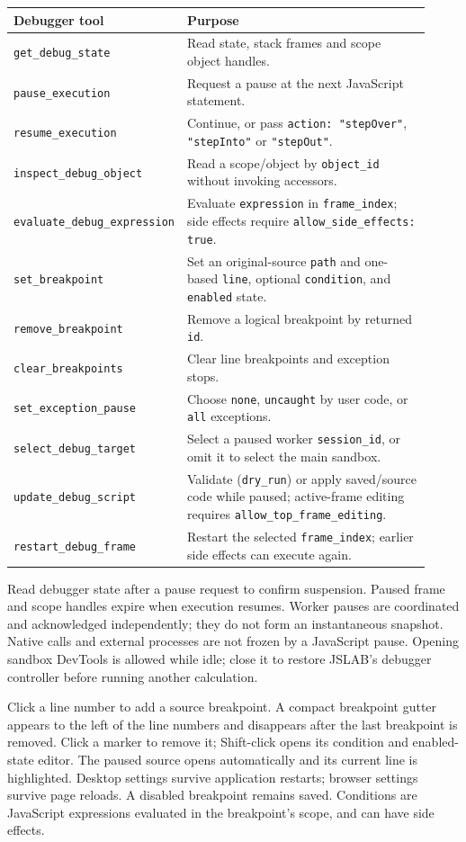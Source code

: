 \documentclass[12pt,a4paper]{article}
\begin{document}
\begin{longtable}{p{0.30\linewidth}p{0.62\linewidth}}
\hline
Debugger tool & Purpose \\
\hline
\texttt{get\_debug\_state} & Read state, stack frames and scope object handles. \\
\texttt{pause\_execution} & Request a pause at the next JavaScript statement. \\
\texttt{resume\_execution} & Continue, or pass \texttt{action: "stepOver"}, \texttt{"stepInto"} or \texttt{"stepOut"}. \\
\texttt{inspect\_debug\_object} & Read a scope/object by \texttt{object\_id} without invoking accessors. \\
\texttt{evaluate\_debug\_expression} & Evaluate \texttt{expression} in \texttt{frame\_index}; side effects require \texttt{allow\_side\_effects: true}. \\
\texttt{set\_breakpoint} & Set an original-source \texttt{path} and one-based \texttt{line}, optional \texttt{condition}, and \texttt{enabled} state. \\
\texttt{remove\_breakpoint} & Remove a logical breakpoint by returned \texttt{id}. \\
\texttt{clear\_breakpoints} & Clear line breakpoints and exception stops. \\
\texttt{set\_exception\_pause} & Choose \texttt{none}, \texttt{uncaught} by user code, or \texttt{all} exceptions. \\
\texttt{select\_debug\_target} & Select a paused worker \texttt{session\_id}, or omit it to select the main sandbox. \\
\texttt{update\_debug\_script} & Validate (\texttt{dry\_run}) or apply saved/source code while paused; active-frame editing requires \texttt{allow\_top\_frame\_editing}. \\
\texttt{restart\_debug\_frame} & Restart the selected \texttt{frame\_index}; earlier side effects can execute again. \\
\hline
\end{longtable}
Read debugger state after a pause request to confirm suspension. Paused frame and scope handles expire when execution resumes. Worker pauses are coordinated and acknowledged independently; they do not form an instantaneous snapshot. Native calls and external processes are not frozen by a JavaScript pause. Opening sandbox DevTools is allowed while idle; close it to restore JSLAB's debugger controller before running another calculation.

Click a line number to add a source breakpoint. A compact breakpoint gutter appears to the left of the line numbers and disappears after the last breakpoint is removed. Click a marker to remove it; Shift-click opens its condition and enabled-state editor. The paused source opens automatically and its current line is highlighted. Desktop settings survive application restarts; browser settings survive page reloads. A disabled breakpoint remains saved. Conditions are JavaScript expressions evaluated in the breakpoint's scope, and can have side effects.
\end{document}
